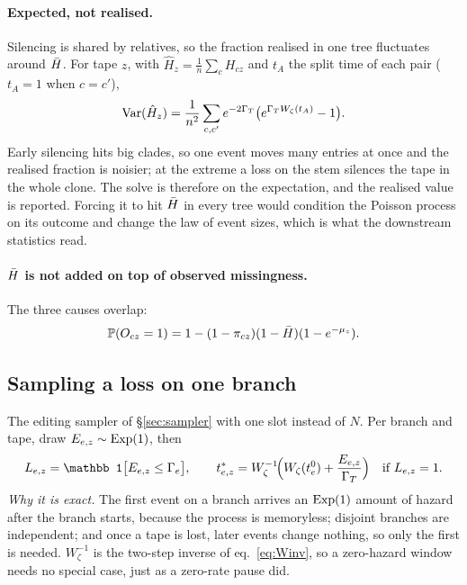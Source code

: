 \paragraph{Expected, not realised.} Silencing is shared by relatives, so the fraction realised in one
tree fluctuates around $\bar H$. For tape $z$, with $\hat H_z=\frac1n\sum_cH_{cz}$ and $t_A$ the split
time of each pair ($t_A=1$ when $c=c'$),
\begin{equation}
  \mathrm{Var}(\hat H_z)=\frac1{n^2}\sum_{c,c'}e^{-2\Gamma_T}\big(e^{\Gamma_T W_\zeta(t_A)}-1\big).
  \label{eq:Hvar}
\end{equation}
Early silencing hits big clades, so one event moves many entries at once and the realised fraction is
noisier; at the extreme a loss on the stem silences the tape in the whole clone. The solve is
therefore on the expectation, and the realised value is reported. Forcing it to hit $\bar H$ in every
tree would condition the Poisson process on its outcome and change the law of event sizes, which is
what the downstream statistics read.

\paragraph{$\bar H$ is not added on top of observed missingness.} The three causes overlap:
\begin{equation}
  \mathbb{P}(O_{cz}=1)=1-(1-\pi_{cz})(1-\bar H)(1-e^{-\mu_z}).
  \label{eq:O3}
\end{equation}

\subsection{Sampling a loss on one branch}\label{sec:losssampler}

The editing sampler of \S\ref{sec:sampler} with one slot instead of $N$. Per branch and tape, draw
$E_{e,z}\sim\operatorname{Exp}(1)$, then
\begin{equation}
  L_{e,z}=\mathbb 1\big[E_{e,z}\le\Gamma_e\big],\qquad
  t^*_{e,z}=W_\zeta^{-1}\!\Big(W_\zeta(t_e^0)+\frac{E_{e,z}}{\GamT}\Big)\quad\text{if }L_{e,z}=1 .
  \label{eq:losssampler}
\end{equation}
\emph{Why it is exact.} The first event on a branch arrives an $\operatorname{Exp}(1)$ amount of hazard after the
branch starts, because the process is memoryless; disjoint branches are independent; and once a tape is
lost, later events change nothing, so only the first is needed. $W_\zeta^{-1}$ is the two-step inverse
of eq.~\eqref{eq:Winv}, so a zero-hazard window needs no special case, just as a zero-rate pause did.

